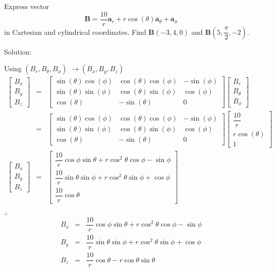 \documentclass{article}
\begin{document}
Express vector 
\[
\mathbf{B=}\dfrac{10}{r}\mathbf{a}_{r}+r\cos \left( \theta \right) \mathbf{a}%
_{\theta }+\mathbf{a}_{\phi }
\]%
in Cartesian and cylindrical coordinates. Find $\mathbf{B}\left(
-3,4,0\right) $ and $\mathbf{B}\left( 5,\dfrac{\pi }{2},-2\right) $.

Solution:

Using $\left( B_{r},B_{\theta },B_{\phi }\right) $ $\longrightarrow \left(
B_{x},B_{y},B_{z}\right) $ 
\begin{eqnarray*}
\left[ 
\begin{array}{c}
B_{x} \\ 
B_{y} \\ 
B_{z}%
\end{array}%
\right]  &=&\left[ 
\begin{array}{ccc}
\sin \left( \theta \right) \cos \left( \phi \right)  & \cos \left( \theta
\right) \cos \left( \phi \right)  & -\sin \left( \phi \right)  \\ 
\sin \left( \theta \right) \sin \left( \phi \right)  & \cos \left( \theta
\right) \sin \left( \phi \right)  & \cos \left( \phi \right)  \\ 
\cos \left( \theta \right)  & -\sin \left( \theta \right)  & 0%
\end{array}%
\right] \left[ 
\begin{array}{c}
B_{r} \\ 
B_{\theta } \\ 
B_{\phi }%
\end{array}%
\right]  \\
&=&\left[ 
\begin{array}{ccc}
\sin \left( \theta \right) \cos \left( \phi \right)  & \cos \left( \theta
\right) \cos \left( \phi \right)  & -\sin \left( \phi \right)  \\ 
\sin \left( \theta \right) \sin \left( \phi \right)  & \cos \left( \theta
\right) \sin \left( \phi \right)  & \cos \left( \phi \right)  \\ 
\cos \left( \theta \right)  & -\sin \left( \theta \right)  & 0%
\end{array}%
\right] \left[ 
\begin{array}{c}
\dfrac{10}{r} \\ 
r\cos \left( \theta \right)  \\ 
1%
\end{array}%
\right]  \\
\left[ 
\begin{array}{c}
B_{x} \\ 
B_{y} \\ 
B_{z}%
\end{array}%
\right]  &=&\left[ 
\begin{array}{c}
\dfrac{10}{r}\cos \phi \sin \theta +r\cos ^{2}\theta \cos \phi -\sin \phi 
\\ 
\dfrac{10}{r}\sin \theta \sin \phi +r\cos ^{2}\theta \sin \phi +\cos \phi 
\\ 
\dfrac{10}{r}\cos \theta 
\end{array}%
\right] 
\end{eqnarray*}

$\therefore $%
\begin{eqnarray*}
B_{x} &=&\dfrac{10}{r}\cos \phi \sin \theta +r\cos ^{2}\theta \cos \phi
-\sin \phi  \\
B_{y} &=&\dfrac{10}{r}\sin \theta \sin \phi +r\cos ^{2}\theta \sin \phi
+\cos \phi  \\
B_{z} &=&\dfrac{10}{r}\cos \theta -r\cos \theta \sin \theta 
\end{eqnarray*}
\end{document}
